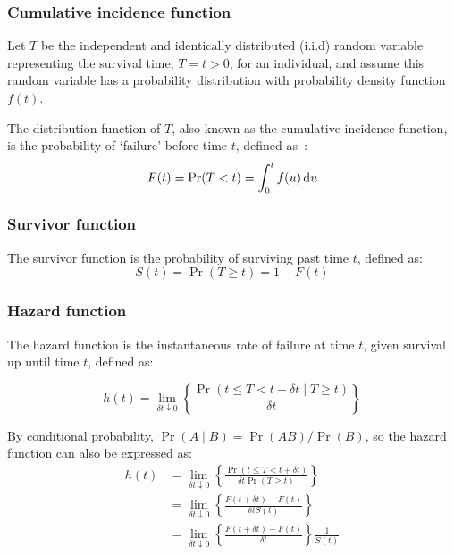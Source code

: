 \subsubsection{Cumulative incidence function}

Let $T$ be the independent and identically distributed (i.i.d) random variable representing the survival time, $T = t>0$, for an individual, and assume this random variable has a probability distribution with probability density function $f(t)$.

The distribution function of $T$, also known as the cumulative incidence function, is the probability of `failure' before time $t$, defined as~\parencite{Collett2023-bg}:
%
\[
    F(t) = \Pr(T<t) = \int_0^t f(u) \mathop{}\!\mathrm{d} u
\]

\subsubsection{Survivor function}

The survivor function is the probability of surviving past time $t$, defined as:
%
\[
    S(t) = \Pr(T \geq t) = 1-F(t)
\]

\subsubsection{Hazard function}

The hazard function is the instantaneous rate of failure at time $t$, given survival up until time $t$, defined as:

\begin{equation}
    h(t) = \lim_{\delta t \downarrow 0} \left\{\frac{\Pr(t \leq T < t + \delta t \mid T \geq t)}{\delta t}\right\}
    \label{eq:hazard-function}
\end{equation}

By conditional probability, $\Pr(A \mid B) = \Pr(AB)/\Pr(B)$, so the hazard function can also be expressed as:
%
\begin{align*}
    h(t) & = \lim_{\delta t \downarrow 0} \left\{\frac{\Pr(t \leq T <t + \delta t)}{\delta t \Pr(T \geq t)}\right\} \\
         & = \lim_{\delta t \downarrow 0} \left\{\frac{F(t + \delta t) - F(t)}{\delta t S(t)}\right\}               \\
         & = \lim_{\delta t \downarrow 0} \left\{\frac{F(t + \delta t) - F(t)}{\delta t}\right\}\frac{1}{S(t)}
\end{align*}

